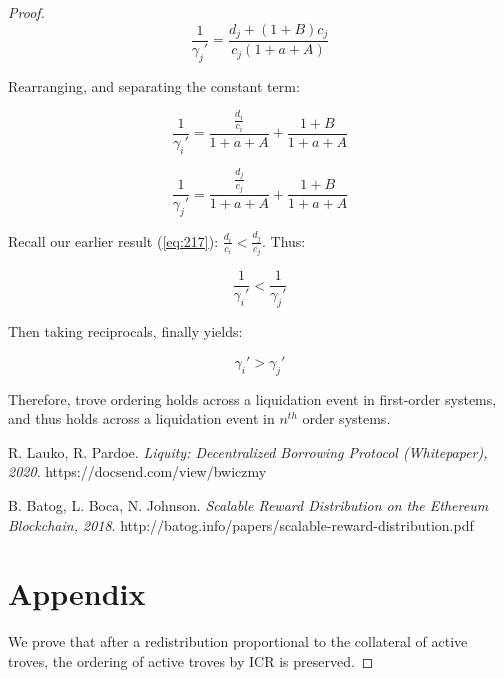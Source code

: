 \documentclass[reqno]{article}
\begin{document}
\begin{proof}
\begin{equation} 
    \frac{1}{\gamma_{j}'}=\frac{d_j+\left(1+B\right)c_j}{c_j\left(1+a+A\right)}
\end{equation}

\bigskip
Rearranging, and separating the constant term:

\begin{equation} 
    \frac{1}{\gamma_{i}'}=\frac{\frac{d_i}{c_i}}{1+a+A}+\frac{1+B}{1+a+A}
\end{equation}

\begin{equation} 
    \frac{1}{\gamma_{j}'}=\frac{\frac{d_j}{c_j}}{1+a+A}+\frac{1+B}{1+a+A}
\end{equation}

\bigskip
Recall our earlier result (\ref{eq:217}): $\frac{d_i}{c_i}<\frac{d_j}{c_j}$. Thus:

\begin{equation} 
    \frac{1}{\gamma_{i}'} < \frac{1}{\gamma_{j}'}
\end{equation}

\bigskip
Then taking reciprocals, finally yields:

\begin{equation} 
    \gamma_{i}' > \gamma_{j}'
\end{equation}

\bigskip
Therefore, trove ordering holds across a liquidation event in first-order systems, and thus holds across a liquidation event in $n^{th}$ order systems.

\bigskip

\begin{thebibliography}{9}

R. Lauko, R. Pardoe. 
\textit{Liquity: Decentralized Borrowing Protocol (Whitepaper), 2020}. 
https://docsend.com/view/bwiczmy

B. Batog, L. Boca, N. Johnson.
\textit{Scalable Reward Distribution on the Ethereum Blockchain, 2018}. 
http://batog.info/papers/scalable-reward-distribution.pdf


\end{thebibliography}

\pagebreak
\section{Appendix} \label{sec:appendix}
We prove that after a redistribution proportional to the collateral of active troves, the ordering of active troves by ICR is preserved. 


\end{proof}
\end{document}
